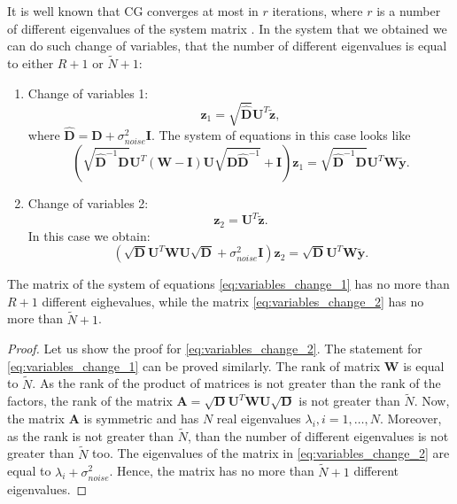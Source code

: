 It is well known that CG converges at most in $r$ iterations, where
$r$ is a number of different eigenvalues of the system matrix \cite{nocedal2006numerical}.
In the system that we obtained we can do such change of variables,
that the number of different eigenvalues is equal to either $R + 1$ or $\widetilde{N} + 1$:
\begin{enumerate}
\item Change of variables 1:
\[
\mathbf{z}_1 = \sqrt{\mathbf{\widehat{D}}} \mathbf{U}^T \mathbf{\widetilde{z}},
\]
where $\mathbf{\widehat{D}} = \mathbf{D} + \sigma^2_{noise}\mathbf{I}$.
The system of equations in this case looks like
\begin{equation}
\label{eq:variables_change_1}
        \left ( \sqrt{\mathbf{\widehat{D}}^{-1} \mathbf{D}} \mathbf{U}^T (\mathbf{W - I})
            \mathbf{U}\sqrt{\mathbf{D \widehat{D}}^{-1}} + \mathbf{I}
        \right ) \mathbf{z}_1 = \sqrt{\mathbf{\widehat{D}}^{-1} \mathbf{D}} \mathbf{U}^T \mathbf{W \widetilde{y}}.
\end{equation}
\item Change of variables 2:
\[
\mathbf{z}_2 = \mathbf{U}^T \mathbf{\widetilde{z}}.
\]
In this case we obtain:
\begin{equation}
\label{eq:variables_change_2}
        \left ( \sqrt{\mathbf{D}} \mathbf{U}^T \mathbf{W}
            \mathbf{U}\sqrt{\mathbf{D}} + \sigma^2_{noise}\mathbf{I}
        \right ) \mathbf{z}_2 = \sqrt{\mathbf{D}} \mathbf{U}^T \mathbf{W \widetilde{y}}.
\end{equation}
\end{enumerate}

\begin{proposition}
The matrix of the system of equations \eqref{eq:variables_change_1} has no more than $R + 1$
different eighevalues,
while the matrix \eqref{eq:variables_change_2} has no more than $\widetilde{N} + 1$.
\end{proposition}
\begin{proof}
    Let us show the proof for \eqref{eq:variables_change_2}.
    The statement for \eqref{eq:variables_change_1} can be proved similarly.
    The rank of matrix $\mathbf{W}$ is equal to $\widetilde{N}$.
    As the rank of the product of matrices is not greater than the rank of the factors,
    the rank of the matrix
    $\mathbf{A} = \sqrt{\mathbf{D}} \mathbf{U}^T \mathbf{W} \mathbf{U}\sqrt{\mathbf{D}}$
    is not greater than $\widetilde{N}$.
    Now, the matrix $\mathbf{A}$ is symmetric and has $N$ real eigenvalues
    $\lambda_i, i = 1, \ldots, N$.
    Moreover, as the rank is not greater than $\widetilde{N}$, than the number of different eigenvalues
    is not greater than $\widetilde{N}$ too.
    The eigenvalues of the matrix in \eqref{eq:variables_change_2}
    are equal to $\lambda_i + \sigma^2_{noise}$.
    Hence, the matrix has no more than $\widetilde{N} + 1$ different eigenvalues.
\end{proof}


